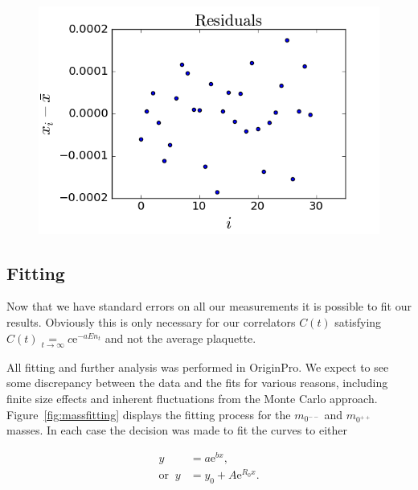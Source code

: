 \documentclass[12pt]{article}
\begin{document}
\begin{figure}
\centering
\includegraphics[width=0.6\linewidth]{residuals.png}
\caption{\label{fig:residuals} }
\end{figure}


\subsection{Fitting}
Now that we have standard errors on all our measurements it is possible to fit our results. Obviously this is only necessary for our correlators $C(t)$ satisfying $C(t) \underset{t\rightarrow \infty}= c\mathrm{e}^{-aEn_t}$ and not the average plaquette.

\par All fitting and further analysis was performed in OriginPro. We expect to see some discrepancy between the data and the fits for various reasons, including finite size effects and inherent fluctuations from the Monte Carlo approach. Figure~\ref{fig:massfitting} displays the fitting process for the $m_{0^{--}}$ and $m_{0^{++}}$ masses. In each case the decision was made to fit the curves to either

\begin{align}
    y &= a\mathrm{e}^{bx},\\
    \mathrm{or} \; \; y &= y_0 + A\mathrm{e}^{R_0x}.
\end{align}
\end{document}
